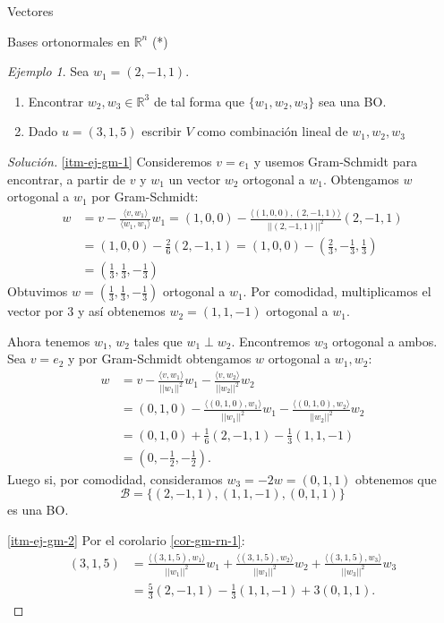 \documentclass[a4paper,12pt,twoside,spanish,reqno]{amsbook}
\numberwithin{equation}{section}
\theoremstyle{definition}
\theoremstyle{remark}
\newtheorem*{ejemplo*}{Ejemplo}
\newcommand{\la}{\langle}
\newcommand{\ra}{\rangle}
\newcommand{\R}{\mathbb R}
\begin{document}
\begin{chapter}{Vectores}
\begin{section}{Bases ortonormales en $\R^n$ (*)}
\begin{ejemplo*}
    Sea $w_1= (2,-1,1)$. 
    \begin{enumerate}
        \item\label{itm-ej-gm-1} Encontrar $w_2,w_3 \in \R^3$ de tal forma que  $\{w_1,w_2,w_3 \}$ sea una BO. 
        \item\label{itm-ej-gm-2} Dado $u = (3,1,5)$ escribir $V$ como combinación lineal de $w_1,w_2,w_3$
    \end{enumerate}
\end{ejemplo*}
\begin{proof}[Solución] \ref{itm-ej-gm-1}
    Consideremos $v=e_1$ y usemos Gram-Schmidt para encontrar,  a partir de $v$ y $w_1$ un vector $w_2$ ortogonal a $w_1$. Obtengamos $w$ ortogonal a $w_1$ por Gram-Schmidt:
    \begin{align*}
        w &= v - \frac{\la v,w_1\ra}{\la w_1,w_1\ra}w_1  = (1,0,0) - \frac{\la (1,0,0),(2,-1,1)\ra}{||(2,-1,1)||^2}(2,-1,1) \\
        &=  (1,0,0) - \frac{2}{6}(2,-1,1) =  (1,0,0) - (\frac{2}{3},-\frac{1}{3},\frac{1}{3})\\
        &=(\frac{1}{3}, \frac{1}{3}, -\frac{1}{3})
    \end{align*}
    Obtuvimos $w = (\frac{1}{3}, \frac{1}{3}, -\frac{1}{3})$ ortogonal a $w_1$. Por  comodidad, multiplicamos el vector por $3$ y así obtenemos $w_2 = (1,1,-1)$ ortogonal a $w_1$. 

    Ahora tenemos $w_1$, $w_2$ tales que $w_1 \perp w_2$. Encontremos $w_3$ ortogonal a ambos. Sea  $v = e_2$ y  por Gram-Schmidt obtengamos $w$ ortogonal a $w_1,w_2$:
    \begin{align*}
        w&= v - \frac{\la v,w_1\ra}{||w_1||^2}w_1- \frac{\la v,w_2\ra}{||w_2||^2}w_2 \\
        &= (0,1,0) - \frac{\la (0,1,0),w_1\ra}{||w_1||^2}w_1- \frac{\la (0,1,0), w_2\ra}{||w_2||^2} w_2\\
        &= (0,1,0) + \frac{1}{6}(2,-1,1)- \frac{1}{3} (1,1,-1)  \\
        &= (0,-\frac{1}{2},-\frac{1}{2}).
       \end{align*}
       Luego si, por comodidad, consideramos $w_3 = -2w =(0,1,1)$ obtenemos que 
       \begin{equation*}
           \mathcal B = \{(2,-1,1),  (1,1,-1), (0,1,1) \}
       \end{equation*}
       es una BO. 

       \ref{itm-ej-gm-2} Por  el corolario \ref{cor-gm-rn-1}:
       \begin{align*}
        (3,1,5) &= \frac{\la (3,1,5),w_1\ra}{ ||w_1||^2} w_1 +\frac{\la (3,1,5),w_2\ra}{||w_1||^2} w_2 +\frac{\la (3,1,5),w_3\ra}{||w_3||^2} w_3 \\
        &=  \frac{5}{3} (2,-1,1) -\frac{1}{3} (1,1,-1) + 3 (0,1,1). 
       \end{align*}
\end{proof}



\end{section}
\end{chapter}
\end{document}
